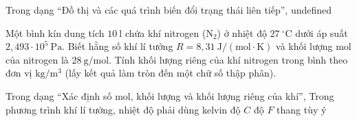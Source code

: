 \begin{bt}
Trong dạng “Đồ thị và các quá trình biến đổi trạng thái liên tiếp”, undefined
\end{bt}

\begin{ex}
Một bình kín dung tích $10\ \mathrm{l}$ chứa khí nitrogen ($\mathrm{N_2}$) ở nhiệt độ $27\ ^\circ\mathrm{C}$ dưới áp suất $2,493 \cdot 10^5\ \mathrm{Pa}$. Biết hằng số khí lí tưởng $R = 8,31\ \mathrm{J/(mol\cdot K)}$ và khối lượng mol của nitrogen là $28\ \mathrm{g/mol}$. Tính khối lượng riêng của khí nitrogen trong bình theo đơn vị $\mathrm{kg/m^3}$ (lấy kết quả làm tròn đến một chữ số thập phân).
\end{ex}

\begin{ex}
Trong dạng “Xác định số mol, khối lượng và khối lượng riêng của khí”, Trong phương trình khí lí tưởng, nhiệt độ phải dùng
\choice
{\True kelvin}
{độ $C$}
{độ $F$}
{thang tùy ý}
\end{ex}

